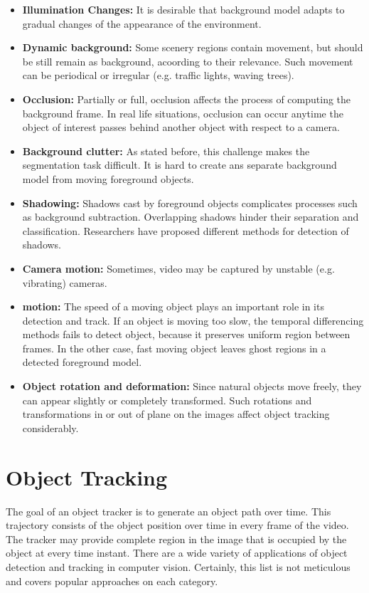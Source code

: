 \begin{itemize}
\item \textbf{Illumination Changes:} It is desirable that background model adapts to gradual changes of the appearance of the environment.
\item \textbf{Dynamic background:} Some scenery regions contain movement, but should be still remain as background, acoording to their relevance. Such movement can be periodical or irregular (e.g. traffic lights, waving trees).
\item \textbf{Occlusion:} Partially or full, occlusion affects the process of computing the background frame. In real life situations, occlusion can occur anytime the object of interest passes behind another object with respect to a camera.
\item \textbf{Background clutter:} As stated before, this challenge makes the segmentation task difficult. It is hard to create ans separate background model from moving foreground objects.
\item \textbf{Shadowing:} Shadows cast by foreground objects complicates processes such as background subtraction. Overlapping shadows hinder their separation and classification. Researchers have proposed different methods for detection of shadows.
\item \textbf{Camera motion:} Sometimes, video may be captured by unstable (e.g. vibrating) cameras.
\item \textbf{motion:} The speed of a moving object plays an important role in its detection and track. If an object is moving too slow, the temporal differencing methods fails to detect object, because it preserves uniform region between frames. In the other case, fast moving object leaves ghost regions in a detected foreground model.
\item \textbf{Object rotation and deformation:} Since natural objects move freely, they can appear slightly or completely transformed. Such rotations and transformations in or out of plane on the images affect object tracking considerably.
\end{itemize}

\section{Object Tracking}

The goal of an object tracker is to generate an object path over time. This trajectory consists of the object position over time in every frame of the video. The tracker may provide complete region in the image that is occupied by the object at every time instant. There are a wide variety of applications of object detection and tracking in computer vision. Certainly, this list is not meticulous and covers popular approaches on each category.

